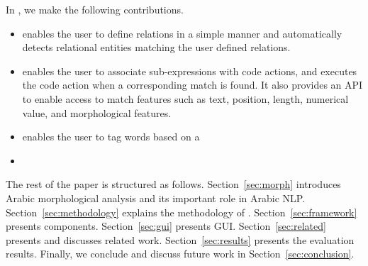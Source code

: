 In \framework, we make the following contributions.
\begin{itemize}
  \item \framework enables the user to define relations in a simple manner
    and automatically detects relational entities matching the user defined relations. 
  \item \framework enables the user to associate sub-expressions
    with code actions, and executes the code action 
    when a corresponding match is found.
    It also provides an API to enable access to match 
    features such as text, position, length, numerical value, and morphological features.
  \item \framework enables the user to tag words based on a 

  \item {}
\end{itemize}

The rest of the paper is structured as follows.
Section~\ref{sec:morph} introduces Arabic morphological analysis 
and its important role in Arabic NLP.
Section~\ref{sec:methodology} explains the methodology of \framework.
Section~\ref{sec:framework} presents \framework components.
Section~\ref{sec:gui} presents \framework GUI. 
Section~\ref{sec:related} presents and discusses related work.
Section~\ref{sec:results} presents the evaluation results. 
Finally, we conclude and discuss future work in Section~\ref{sec:conclusion}.

